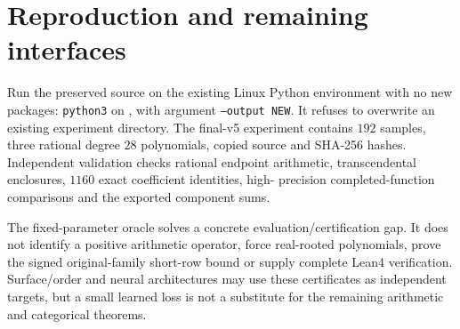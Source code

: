 \section{Reproduction and remaining interfaces}
Run the preserved source on the existing Linux Python environment with no new
packages: \texttt{python3} on , with argument \texttt{--output NEW}.
It refuses to overwrite an existing experiment directory. The final-v5
experiment contains $192$ samples, three rational degree $28$ polynomials, copied
source and SHA-256 hashes. Independent validation checks rational endpoint
arithmetic, transcendental enclosures, $1160$ exact coefficient identities, high-
precision completed-function comparisons and the exported component sums.

The fixed-parameter oracle solves a concrete evaluation/certification gap.
It does not identify a positive arithmetic operator, force real-rooted
polynomials, prove the signed original-family short-row bound or supply
complete Lean4 verification. Surface/order and neural architectures may use
these certificates as independent targets, but a small learned loss is not a
substitute for the remaining arithmetic and categorical theorems.
